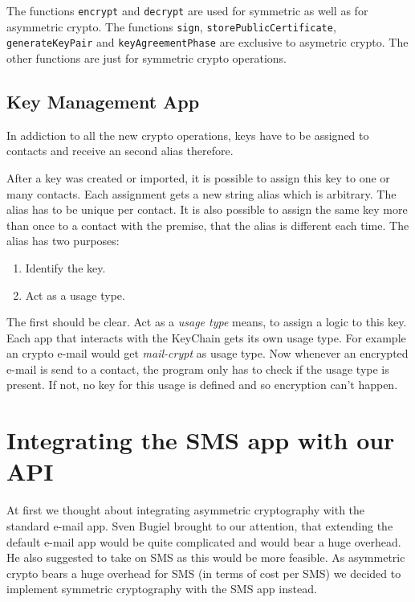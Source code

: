 \documentclass[a4paper,draft]{scrartcl}
\begin{document}
		The functions \texttt{encrypt} and \texttt{decrypt} are used for symmetric as well as for asymmetric crypto. %
		The functions \texttt{sign}, \texttt{storePublicCertificate}, \texttt{generateKeyPair} and \texttt{keyAgreementPhase} are exclusive to asymetric crypto. The other functions are just for symmetric crypto operations.
	
	\subsection{Key Management App}
		In addiction to all the new crypto operations, keys have to be assigned to contacts and receive an second alias therefore.
		
		After a key was created or imported, it is possible to assign this key to one or many contacts. Each assignment gets a new string alias which is arbitrary. The alias has to be unique per contact. It is also possible to assign the same key more than once to a contact with the premise, that the alias is different each time. The alias has two purposes:
		\begin{enumerate}
			\item Identify the key.
			\item Act as a usage type.
		\end{enumerate}
		The first should be clear. Act as a \emph{usage type} means, to assign a logic to this key. Each app that interacts with the KeyChain gets its own usage type. For example an crypto e-mail would get \textit{mail-crypt} as usage type. Now whenever an encrypted e-mail is send to a contact, the program only has to check if the usage type is present. If not, no key for this usage is defined and so encryption can't happen.
		
\section{Integrating the SMS app with our API}
	\label{sec-sms-app}
	At first we thought about integrating asymmetric cryptography with the standard e-mail app. Sven Bugiel brought to our attention, that extending the default e-mail app would be quite complicated and would bear a huge overhead. He also suggested to take on SMS as this would be more feasible. As asymmetric crypto bears a huge overhead for SMS (in terms of cost per SMS) we decided to implement symmetric cryptography with the SMS app instead. %
	
\end{document}
